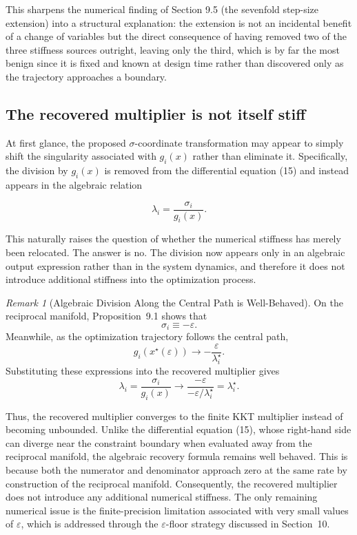 \documentclass[11pt,onecolumn]{article}
\theoremstyle{definition}
\theoremstyle{remark}
\newtheorem{remark}[theorem]{Remark}
\begin{document}
This sharpens the numerical finding of Section 9.5 (the sevenfold step-size extension) into a
structural explanation: the extension is not an incidental benefit of a change of variables but
the direct consequence of having removed two of the three stiffness sources outright, leaving
only the third, which is by far the most benign since it is fixed and known at design time
rather than discovered only as the trajectory approaches a boundary.

\subsection{The recovered multiplier is not itself stiff}

At first glance, the proposed $\sigma$-coordinate transformation may appear to simply shift the singularity associated with $g_i(x)$ rather than eliminate it. Specifically, the division by $g_i(x)$ is removed from the differential equation (15) and instead appears in the algebraic relation

\[
\lambda_i=\frac{\sigma_i}{g_i(x)}.
\]

This naturally raises the question of whether the numerical stiffness has merely been relocated. The answer is no. The division now appears only in an algebraic output expression rather than in the system dynamics, and therefore it does not introduce additional stiffness into the optimization process.

\begin{remark}[Algebraic Division Along the Central Path is Well-Behaved]
On the reciprocal manifold, Proposition~9.1 shows that
\[
\sigma_i\equiv-\varepsilon.
\]
Meanwhile, as the optimization trajectory follows the central path,
\[
g_i(x^\star(\varepsilon))
\rightarrow
-\frac{\varepsilon}{\lambda_i^\star}.
\]
Substituting these expressions into the recovered multiplier gives
\[
\lambda_i=\frac{\sigma_i}{g_i(x)}
\rightarrow
\frac{-\varepsilon}{-\varepsilon/\lambda_i^\star}
=
\lambda_i^\star.
\]

Thus, the recovered multiplier converges to the finite KKT multiplier instead of becoming unbounded. Unlike the differential equation (15), whose right-hand side can diverge near the constraint boundary when evaluated away from the reciprocal manifold, the algebraic recovery formula remains well behaved. This is because both the numerator and denominator approach zero at the same rate by construction of the reciprocal manifold. Consequently, the recovered multiplier does not introduce any additional numerical stiffness. The only remaining numerical issue is the finite-precision limitation associated with very small values of $\varepsilon$, which is addressed through the $\varepsilon$-floor strategy discussed in Section~10.
\end{remark}
\end{document}
